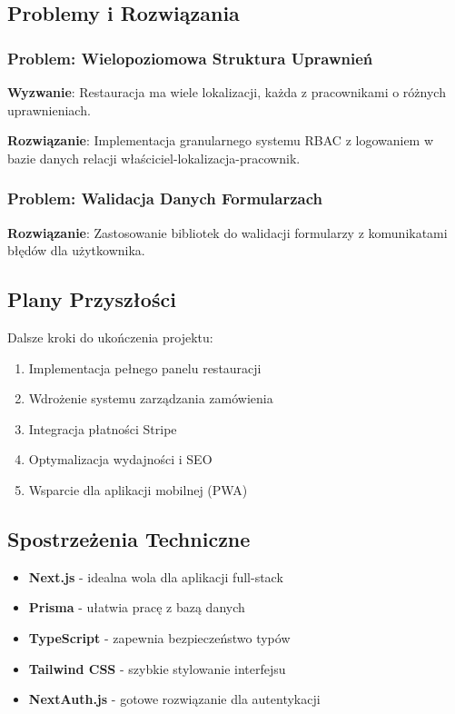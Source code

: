 ﻿\documentclass[12pt,a4paper,utf-8]{article}
\begin{document}
\subsection{Problemy i Rozwiązania}

\subsubsection{Problem: Wielopoziomowa Struktura Uprawnień}

\textbf{Wyzwanie}: Restauracja ma wiele lokalizacji, każda z pracownikami o różnych uprawnieniach.

\textbf{Rozwiązanie}: Implementacja granularnego systemu RBAC z logowaniem w bazie danych relacji właściciel-lokalizacja-pracownik.

\subsubsection{Problem: Walidacja Danych Formularzach}

\textbf{Rozwiązanie}: Zastosowanie bibliotek do walidacji formularzy z komunikatami błędów dla użytkownika.

\subsection{Plany Przyszłości}

Dalsze kroki do ukończenia projektu:

\begin{enumerate}
    \item Implementacja pełnego panelu restauracji
    \item Wdrożenie systemu zarządzania zamówienia
    \item Integracja płatności Stripe
    \item Optymalizacja wydajności i SEO
    \item Wsparcie dla aplikacji mobilnej (PWA)
\end{enumerate}

\subsection{Spostrzeżenia Techniczne}

\begin{itemize}
    \item \textbf{Next.js}  -  idealna wola dla aplikacji full-stack
    \item \textbf{Prisma}  -  ułatwia pracę z bazą danych
    \item \textbf{TypeScript}  -  zapewnia bezpieczeństwo typów
    \item \textbf{Tailwind CSS}  -  szybkie stylowanie interfejsu
    \item \textbf{NextAuth.js}  -  gotowe rozwiązanie dla autentykacji
\end{itemize}
\end{document}
